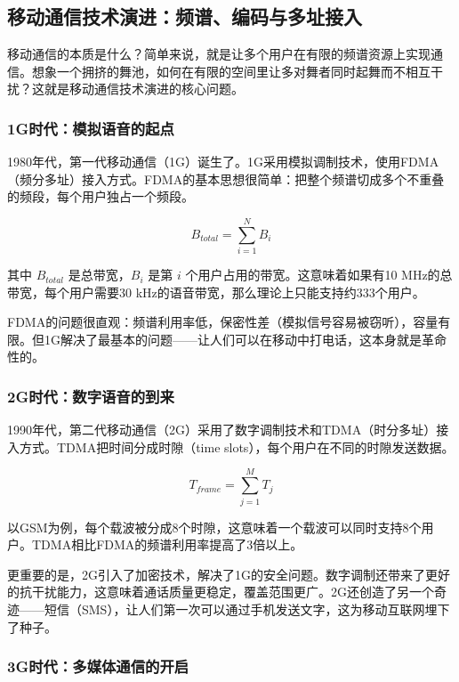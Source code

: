 \subsection{移动通信技术演进：频谱、编码与多址接入}

移动通信的本质是什么？简单来说，就是让多个用户在有限的频谱资源上实现通信。想象一个拥挤的舞池，如何在有限的空间里让多对舞者同时起舞而不相互干扰？这就是移动通信技术演进的核心问题。

\subsubsection{1G时代：模拟语音的起点}

1980年代，第一代移动通信（1G）诞生了。1G采用模拟调制技术，使用FDMA（频分多址）接入方式。FDMA的基本思想很简单：把整个频谱切成多个不重叠的频段，每个用户独占一个频段。

\begin{equation}
B_{total} = \sum_{i=1}^{N} B_i
\end{equation}

其中 $B_{total}$ 是总带宽，$B_i$ 是第 $i$ 个用户占用的带宽。这意味着如果有10 MHz的总带宽，每个用户需要30 kHz的语音带宽，那么理论上只能支持约333个用户。

FDMA的问题很直观：频谱利用率低，保密性差（模拟信号容易被窃听），容量有限。但1G解决了最基本的问题——让人们可以在移动中打电话，这本身就是革命性的。

\subsubsection{2G时代：数字语音的到来}

1990年代，第二代移动通信（2G）采用了数字调制技术和TDMA（时分多址）接入方式。TDMA把时间分成时隙（time slots），每个用户在不同的时隙发送数据。

\begin{equation}
T_{frame} = \sum_{j=1}^{M} T_j
\end{equation}

以GSM为例，每个载波被分成8个时隙，这意味着一个载波可以同时支持8个用户。TDMA相比FDMA的频谱利用率提高了3倍以上。

更重要的是，2G引入了加密技术，解决了1G的安全问题。数字调制还带来了更好的抗干扰能力，这意味着通话质量更稳定，覆盖范围更广。2G还创造了另一个奇迹——短信（SMS），让人们第一次可以通过手机发送文字，这为移动互联网埋下了种子。

\subsubsection{3G时代：多媒体通信的开启}


